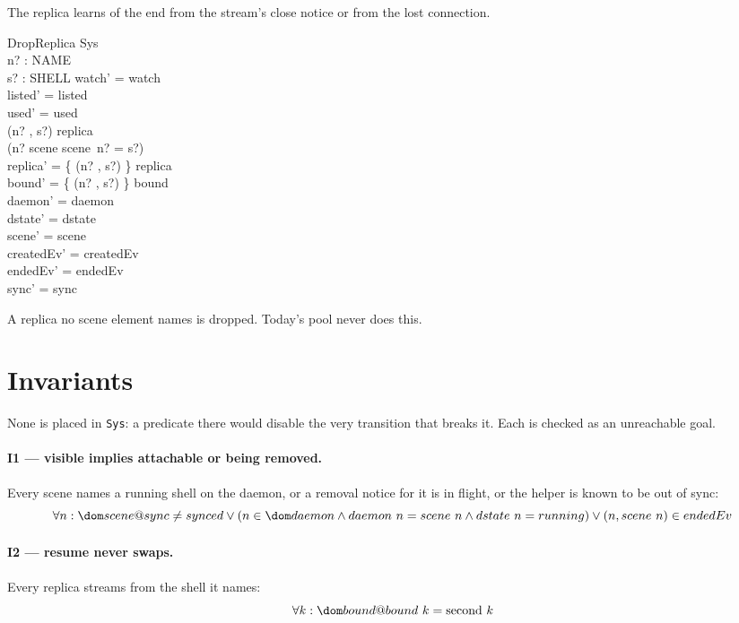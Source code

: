 \documentclass[a4paper,10pt,fleqn]{article}
\begin{document}
The replica learns of the end from the stream's close notice or from the
lost connection.

\begin{schema}{DropReplica}
  \Delta Sys \\
  n? : NAME \\
  s? : SHELL
\where
  watch' = watch \\
  listed' = listed \\
  used' = used \\
  (n? , s?) \in \dom replica \\
  \lnot (n? \in \dom scene \land scene~n? = s?) \\
  replica' = \{ (n? , s?) \} \ndres replica \\
  bound' = \{ (n? , s?) \} \ndres bound \\
  daemon' = daemon \\
  dstate' = dstate \\
  scene' = scene \\
  createdEv' = createdEv \\
  endedEv' = endedEv \\
  sync' = sync
\end{schema}

A replica no scene element names is dropped.  Today's pool never does
this.

\section{Invariants}
\label{sec:inv}

None is placed in \texttt{Sys}: a predicate there would disable the very
transition that breaks it.  Each is checked as an unreachable goal.

\paragraph{I1 --- visible implies attachable or being removed.}
Every scene names a running shell on the daemon, or a removal notice for
it is in flight, or the helper is known to be out of sync:
\[
  \forall n : \dom scene @ sync \neq synced \lor
    (n \in \dom daemon \land daemon~n = scene~n \land dstate~n = running)
    \lor (n , scene~n) \in endedEv
\]

\paragraph{I2 --- resume never swaps.}
Every replica streams from the shell it names:
\[
  \forall k : \dom bound @ bound~k = \mathrm{second}~k
\]
\end{document}
